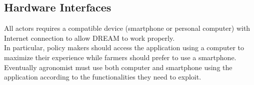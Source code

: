 \subsection{Hardware Interfaces}

All actors requires a compatible device (smartphone or personal computer) with Internet connection to allow DREAM to work properly.\\
In particular, policy makers should access the application using a computer to maximize their experience while farmers should prefer to use a smartphone. Eventually agronomist must use both computer and smartphone using the application according to the functionalities they need to exploit.